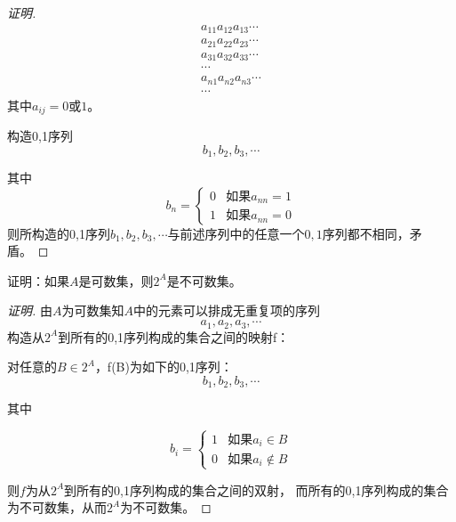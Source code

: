 \documentclass{article}
\begin{document}
\begin{CJK}{UTF8}{gbsn}
\begin{proof}[证明]
  \begin{align*}
    a_{11}a_{12}a_{13}\cdots\\
    a_{21}a_{22}a_{23}\cdots\\
    a_{31}a_{32}a_{33}\cdots\\
    \cdots\\
    a_{n1}a_{n2}a_{n3}\cdots\\
    \cdots
  \end{align*}
  其中$a_{ij}=0$或$1$。

  构造0,1序列
\[b_1,b_2,b_3,\cdots\]

其中
\[b_n=
\begin{cases}
  0&\text{如果}a_{nn}=1\\
  1&\text{如果}a_{nn}=0
\end{cases}\]
则所构造的0,1序列$b_1,b_2,b_3,\cdots$与前述序列中的任意一个$0,1$序列都不相同，矛盾。
\end{proof}
\begin{Exercise}
  证明：如果$A$是可数集，则$2^A$是不可数集。
\end{Exercise}
\begin{proof}[证明]
  由$A$为可数集知$A$中的元素可以排成无重复项的序列
  \[a_1,a_2,a_3,\cdots\]
  构造从$2^A$到所有的0,1序列构成的集合之间的映射f：

  对任意的$B\in 2^A$，f(B)为如下的0,1序列：
  \[b_1,b_2,b_3,\cdots\]

  其中

  \[b_i=\begin{cases}
    1& \text{如果}a_i\in B\\
    0& \text{如果}a_i\notin B
  \end{cases}\]
  
  则$f$为从$2^A$到所有的0,1序列构成的集合之间的双射，
  而所有的0,1序列构成的集合为不可数集，从而$2^A$为不可数集。
\end{proof}

\end{CJK}
\end{document}
